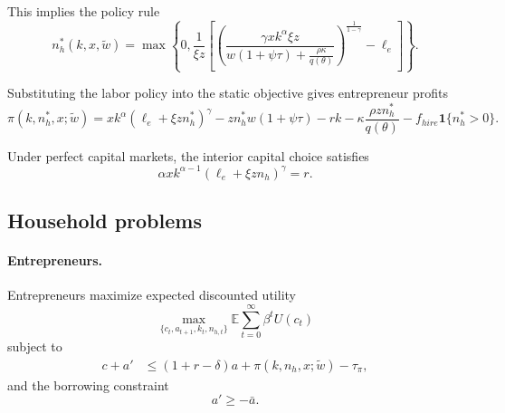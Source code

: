 This implies the policy rule
\begin{equation}
    n_h^*(k,x,\widetilde{w})
    =
    \max\left\{
        0,
        \frac{1}{\xi z}
        \left[
            \left(
                \frac{\gamma x k^{\alpha}\xi z}
                {w(1+\psi\tau)+\frac{\rho\kappa}{q(\theta)}}
            \right)^{\frac{1}{1-\gamma}}
            - \ell_e
        \right]
    \right\}.
    \label{eq:nh_policy_self_employment}
\end{equation}

Substituting the labor policy into the static objective gives entrepreneur
profits
\begin{equation}
    \pi(k,n_h^*,x;\widetilde{w})
    =
    x k^{\alpha}\left(\ell_e + \xi z n_h^*\right)^{\gamma}
    - z n_h^* w(1+\psi\tau)
    - rk
    - \kappa \frac{\rho z n_h^*}{q(\theta)}
    - f_{hire}\mathbf{1}\{n_h^*>0\}.
    \label{eq:profit_self_employment}
\end{equation}

Under perfect capital markets, the interior capital choice satisfies
\begin{equation}
    \alpha x k^{\alpha - 1}\left(\ell_e + \xi z n_h\right)^{\gamma} = r.
    \label{eq:foc_capital_self_employment}
\end{equation}

\subsection{Household problems}

\paragraph{Entrepreneurs.}

Entrepreneurs maximize expected discounted utility
\begin{equation}
    \max_{\{c_t, a_{t+1}, k_t, n_{h,t}\}}
    \mathbb{E}\sum_{t=0}^{\infty}\beta^t U(c_t)
\end{equation}
subject to
\begin{align}
    c + a'
    &\leq
    (1 + r - \delta)a
    + \pi(k,n_h,x;\widetilde{w})
    - \tau_{\pi},
    \label{eq:budget_entrepreneur_self_employment}
\end{align}
and the borrowing constraint
\begin{equation}
    a' \geq -\bar{a}.
    \label{eq:borrowing_constraint_self_employment}
\end{equation}

